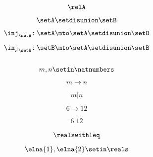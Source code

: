 \begin{forslides}
    \begin{equation}
        \label{eq:parallelism-120}
        \relA
    \end{equation}

    \begin{equation}
        \label{eq:parallelism-121}
        \setA \setdisunion \setB
    \end{equation}

    \begin{equation}
        \label{eq:parallelism-122}
        \inj_\setA\colon \setA\mto \setA \setdisunion\setB
    \end{equation}

    \begin{equation}
        \label{eq:parallelism-123}
        \inj_\setB\colon \setB\mto \setA \setdisunion\setB
    \end{equation}

    \begin{equation}
        \label{eq:parallelism-124}
    \end{equation}

    \begin{equation}
        \label{eq:parallelism-125}
        m,n\setin \natnumbers
    \end{equation}

    \begin{equation}
        \label{eq:parallelism-126}
        m\to n
    \end{equation}

    \begin{equation}
        \label{eq:parallelism-127}
        m | n
    \end{equation}

    \begin{equation}
        \label{eq:parallelism-128}
        6\to 12
    \end{equation}

    \begin{equation}
        \label{eq:parallelism-129}
        6 | 12
    \end{equation}

    \begin{equation}
        \label{eq:parallelism-130}
        \realswithleq
    \end{equation}

    \begin{equation}
        \label{eq:parallelism-131}
        \elna{1},\elna{2}\setin \reals
    \end{equation}


\end{forslides}
